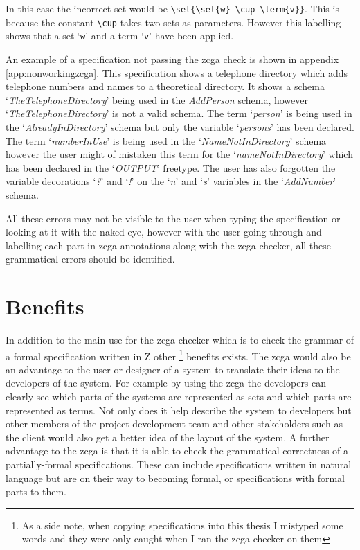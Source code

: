 In this case the incorrect set would be \verb|\set{\set{w} \cup \term{v}}|. This
is because the constant \verb|\cup| takes two sets as parameters. However this
labelling shows that a set `\verb|w|' and a term `\verb|v|' have been applied. 

An example of a specification not passing the \gls{zcga} check is shown in
appendix \ref{app:nonworkingzcga}. This specification shows a telephone directory
which adds telephone numbers and names to a theoretical directory. It shows a
schema `\emph{TheTelephoneDirectory}' being used in the \emph{AddPerson}
schema, however `\emph{TheTelephoneDirectory}' is not a valid schema. The term
`\emph{person}' is being used in the `\emph{AlreadyInDirectory}' schema but only
the variable `\emph{persons}' has been declared. The term `\emph{numberInUse}'
is being used in the `\emph{NameNotInDirectory}' schema however the user might
of mistaken this term for the `\emph{nameNotInDirectory}' which has been
declared in the `\emph{OUTPUT}' freetype. The user has also forgotten the
variable decorations `\emph{?}' and `\emph{!}' on the `\emph{n}' and `\emph{s}'
variables in the `\emph{AddNumber}' schema.

All these errors may not be visible to the user when typing the specification or
looking at it with the naked eye, however with the user going through and
labelling each part in \gls{zcga} annotations along with the \gls{zcga} checker,
all these grammatical errors should be identified.


\section{Benefits}

In addition to the main use for the \gls{zcga} checker which is to check the
grammar of a formal specification written in Z other \footnote{As a side note,
when copying specifications into this thesis I mistyped some words and they were
only caught when I ran the \gls{zcga} checker on them} benefits exists. The
\gls{zcga} would also be an advantage to the user or designer of a system to
translate their ideas to the developers of the system. For example by using the
\gls{zcga} the developers can clearly see which parts of the systems are
represented as sets and which parts are represented as terms. Not only does it
help describe the system to developers but other members of the project
development team and other stakeholders such as the client would also get a
better idea of the layout of the system. A further advantage to the \gls{zcga}
is that it is able to check the grammatical correctness of a partially-formal
specifications. These can include specifications written in natural
language but are on their way to becoming formal, or specifications with formal
parts to them.

